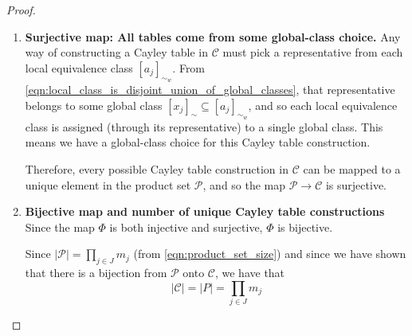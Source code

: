 \begin{proof}
\begin{enumerate}[(1)]
    \item \textbf{Surjective map: All tables come from some global-class choice.}
    Any way of constructing a Cayley table in $\mathscr{C}$ must pick a representative from each local equivalence class $[a_{j}]_{\sim_{w}}$.
    From \cref{eqn:local_class_is_disjoint_union_of_global_classes}, that representative belongs to some global class $[x_{j}]_{\sim} \subseteq [a_{j}]_{\sim_{w}}$, and so each local equivalence class is assigned (through its representative) to a single global class.
    This means we have a global-class choice for this Cayley table construction.

    Therefore, every possible Cayley table construction in $\mathscr{C}$ can be mapped to a unique element in the product set $\mathcal{P}$, and so the map $\mathcal{P} \to \mathcal{C}$ is surjective.

    \item \textbf{Bijective map and number of unique Cayley table constructions}
    Since the map $\Phi$ is both injective and surjective, $\Phi$ is bijective.

    Since $|\mathcal{P}| = \prod_{j \in J} m_{j}$ (from \cref{eqn:product_set_size}) and since we have shown that there is a bijection from $\mathcal{P}$ onto $\mathcal{C}$, we have that
    \begin{equation}
        |\mathcal{C}| = |P| = \prod_{j \in J} m_{j}
    \end{equation}
\end{enumerate}
\end{proof}


